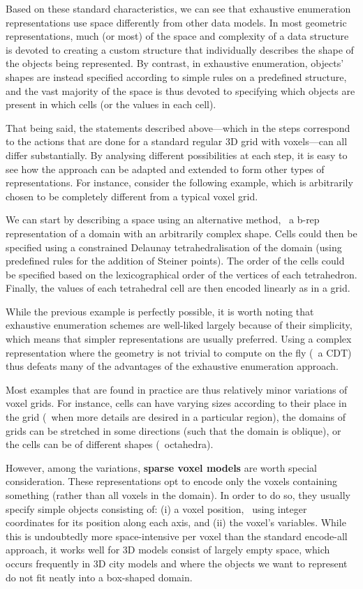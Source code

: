 Based on these standard characteristics, we can see that exhaustive enumeration representations use space differently from other data models.
In most geometric representations, much (or most) of the space and complexity of a data structure is devoted to creating a custom structure that individually describes the shape of the objects being represented.
By contrast, in exhaustive enumeration, objects' shapes are instead specified according to simple rules on a predefined structure, and the vast majority of the space is thus devoted to specifying which objects are present in which cells (or the values in each cell).

That being said, the statements described above---which in the steps correspond to the actions that are done for a standard regular 3D grid with voxels---can all differ substantially.
By analysing different possibilities at each step, it is easy to see how the approach can be adapted and extended to form other types of representations.
For instance, consider the following example, which is arbitrarily chosen to be completely different from a typical voxel grid.

We can start by describing a space using an alternative method, \eg\ a b-rep representation of a domain with an arbitrarily complex shape.
Cells could then be specified using a constrained Delaunay tetrahedralisation of the domain (using predefined rules for the addition of Steiner points).
The order of the cells could be specified based on the lexicographical order of the vertices of each tetrahedron.
Finally, the values of each tetrahedral cell are then encoded linearly as in a grid.

While the previous example is perfectly possible, it is worth noting that exhaustive enumeration schemes are well-liked largely because of their simplicity, which means that simpler representations are usually preferred.
Using a complex representation where the geometry is not trivial to compute on the fly (\eg\ a CDT) thus defeats many of the advantages of the exhaustive enumeration approach.

Most examples that are found in practice are thus relatively minor variations of voxel grids.
For instance, cells can have varying sizes according to their place in the grid (\eg\ when more details are desired in a particular region), the domains of grids can be stretched in some directions (such that the domain is oblique), or the cells can be of different shapes (\eg\ octahedra).

However, among the variations, \textbf{sparse voxel models} are worth special consideration.
These representations opt to encode only the voxels containing something (rather than all voxels in the domain).
In order to do so, they usually specify simple objects consisting of: (i) a voxel position, \eg\ using integer coordinates for its position along each axis, and (ii) the voxel's variables.
While this is undoubtedly more space-intensive per voxel than the standard encode-all approach, it works well for 3D models consist of largely empty space, which occurs frequently in 3D city models and where the objects we want to represent do not fit neatly into a box-shaped domain.

